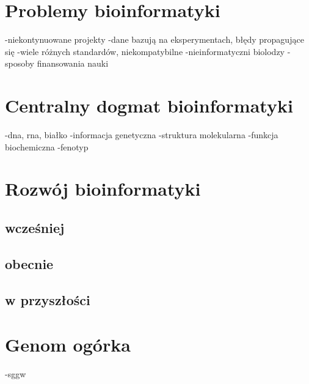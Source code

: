\section{Problemy bioinformatyki}
-niekontynuowane projekty
-dane bazują na eksperymentach, błędy propagujące się
-wiele różnych standardów, niekompatybilne
-nieinformatyczni biolodzy
-sposoby finansowania nauki

\section{Centralny dogmat bioinformatyki}
-dna, rna, białko
-informacja genetyczna
-struktura molekularna
-funkcja biochemiczna
-fenotyp

\section{Rozwój bioinformatyki}
\subsection{wcześniej}
\subsection{obecnie}
\subsection{w przyszłości}

\section{Genom ogórka}
-sggw
